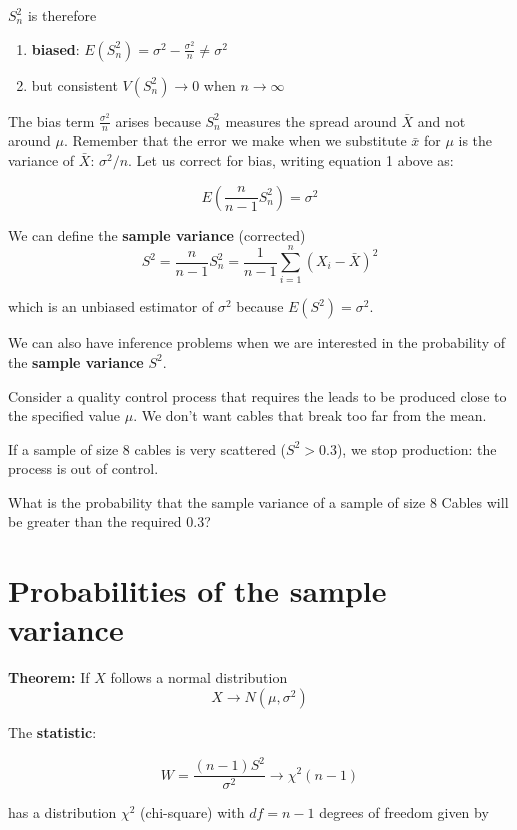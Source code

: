 \documentclass[
]{book}
\providecommand{\tightlist}{%
  \setlength{\itemsep}{0pt}\setlength{\parskip}{0pt}}
\begin{document}
\(S_n^2\) is therefore

\begin{enumerate}
\def\labelenumi{\arabic{enumi})}
\tightlist
\item
  \textbf{biased}: \(E(S_n^2) = \sigma^2-\frac{\sigma^2}{n} \neq \sigma^2\)
\item
  but consistent \(V(S_n^2) \rightarrow 0\) when \(n\rightarrow \infty\)
\end{enumerate}

The bias term \(\frac{\sigma^2}{n}\) arises because \(S_n^2\) measures the spread around \(\bar{X}\) and not around \(\mu\). Remember that the error we make when we substitute \(\bar{x}\) for \(\mu\) is the variance of \(\bar{X}\): \(\sigma^2/n\). Let us correct for bias, writing equation 1 above as:

\[E(\frac{n}{n-1}S_n^2)=\sigma^2\]

We can define the \textbf{sample variance} (corrected) \[S^2=\frac{n}{n-1}S_n^2=\frac{1}{n-1}\sum_{i=1}^ n(X_i-\bar{X})^2\]

which is an unbiased estimator of \(\sigma^2\) because \(E(S^2)=\sigma^2\).

We can also have inference problems when we are interested in the probability of the \textbf{sample variance} \(S^2\).

Consider a quality control process that requires the leads to be produced close to the specified value \(\mu\). We don't want cables that break too far from the mean.

If a sample of size \(8\) cables is very scattered (\(S^2>0.3\)), we stop production: the process is out of control.

What is the probability that the sample variance of a sample of size \(8\) Cables will be greater than the required \(0.3\)?

\hypertarget{probabilities-of-the-sample-variance}{%
\section{Probabilities of the sample variance}\label{probabilities-of-the-sample-variance}}

\textbf{Theorem:} If \(X\) follows a normal distribution
\[X \rightarrow N(\mu, \sigma^2)\]

The \textbf{statistic}:

\[W=\frac{(n-1)S^2}{\sigma^2} \rightarrow \chi^2(n-1)\]

has a distribution \(\chi^2\) (chi-square) with \(df=n-1\) degrees of freedom given by
\end{document}
